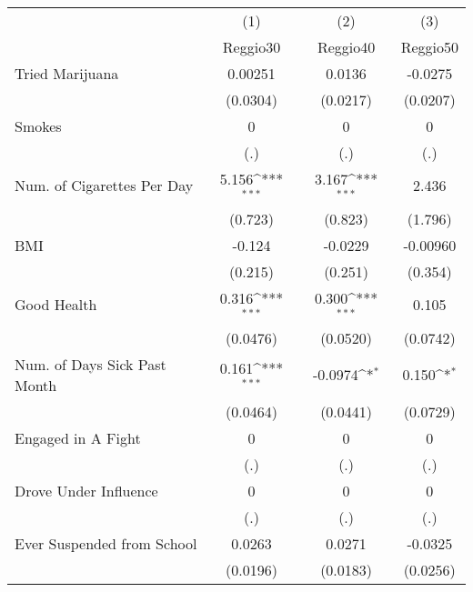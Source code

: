 {
\def\sym#1{\ifmmode^{#1}\else\(^{#1}\)\fi}
\begin{tabular}{l*{3}{c}}
\hline\hline
            &\multicolumn{1}{c}{(1)}&\multicolumn{1}{c}{(2)}&\multicolumn{1}{c}{(3)}\\
            &\multicolumn{1}{c}{Reggio30}&\multicolumn{1}{c}{Reggio40}&\multicolumn{1}{c}{Reggio50}\\
\hline
Tried Marijuana&     0.00251         &      0.0136         &     -0.0275         \\
            &    (0.0304)         &    (0.0217)         &    (0.0207)         \\
[1em]
Smokes      &           0         &           0         &           0         \\
            &         (.)         &         (.)         &         (.)         \\
[1em]
Num. of Cigarettes Per Day&       5.156\sym{***}&       3.167\sym{***}&       2.436         \\
            &     (0.723)         &     (0.823)         &     (1.796)         \\
[1em]
BMI         &      -0.124         &     -0.0229         &    -0.00960         \\
            &     (0.215)         &     (0.251)         &     (0.354)         \\
[1em]
Good Health &       0.316\sym{***}&       0.300\sym{***}&       0.105         \\
            &    (0.0476)         &    (0.0520)         &    (0.0742)         \\
[1em]
Num. of Days Sick Past Month&       0.161\sym{***}&     -0.0974\sym{*}  &       0.150\sym{*}  \\
            &    (0.0464)         &    (0.0441)         &    (0.0729)         \\
[1em]
Engaged in A Fight&           0         &           0         &           0         \\
            &         (.)         &         (.)         &         (.)         \\
[1em]
Drove Under Influence&           0         &           0         &           0         \\
            &         (.)         &         (.)         &         (.)         \\
[1em]
Ever Suspended from School&      0.0263         &      0.0271         &     -0.0325         \\
            &    (0.0196)         &    (0.0183)         &    (0.0256)         \\

\end{tabular}}
